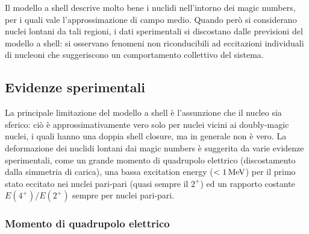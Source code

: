 Il modello a shell descrive molto bene i nuclidi nell'intorno dei magic numbers, per i quali vale l'approssimazione di campo medio. Quando però si considerano nuclei lontani da tali regioni, i dati sperimentali si discostano dalle previsioni del modello a shell: si osservano fenomeni non riconducibili ad eccitazioni individuali di nucleoni che suggeriscono un comportamento collettivo del sistema.

\subsection{Evidenze sperimentali}

La principale limitazione del modello a shell è l'assunzione che il nucleo sia sferico: ciò è approssimativamente vero solo per nuclei vicini ai doubly-magic nuclei, i quali hanno una doppia shell closure, ma in generale non è vero. La deformazione dei nuclidi lontani dai magic numbers è suggerita da varie evidenze sperimentali, come un grande momento di quadrupolo elettrico (discostamento dalla simmetria di carica), una bassa excitation energy ($ < 1\,\mathrm{MeV} $) per il primo stato eccitato nei nuclei pari-pari (quasi sempre il $ 2^+ $) ed un rapporto costante $ E(4^+) / E(2^+) $ sempre per nuclei pari-pari.

\subsubsection{Momento di quadrupolo elettrico}

